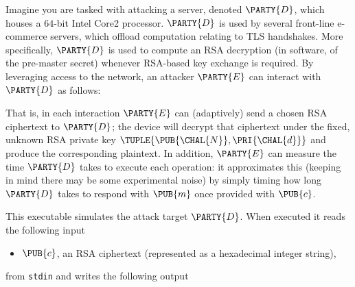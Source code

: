 %



Imagine you are tasked with attacking a server, denoted $\PARTY{D}$, 
which houses a $64$-bit Intel Core2 processor.  
$\PARTY{D}$ is used by several front-line e-commerce servers, which offload
computation relating to TLS handshakes.  More specifically, $\PARTY{D}$ is 
used to compute an RSA decryption (in software, of the pre-master secret)
whenever RSA-based key exchange is required.
By leveraging access to the network, 
an attacker $\PARTY{E}$ can interact with $\PARTY{D}$ as follows:

\begin{center}

\end{center}

\noindent
That is, in each interaction $\PARTY{E}$ can (adaptively) send 
a chosen RSA ciphertext
to $\PARTY{D}$; the device will
decrypt that ciphertext under the fixed, unknown RSA private key $\TUPLE{ \PUB{\CHAL{N}}, \PRI{\CHAL{d}} }$ 
and produce 
the corresponding plaintext.
In addition, $\PARTY{E}$ can measure the time $\PARTY{D}$ takes to execute 
each operation: it approximates this 
(keeping in mind there may be some experimental noise) 
by simply timing how long $\PARTY{D}$ takes to respond with $\PUB{m}$ once
provided with $\PUB{c}$.




This executable simulates the attack target $\PARTY{D}$.  When executed it 
reads the following input

\begin{itemize}
\item $\PUB{c}$,
      an RSA ciphertext
      (represented as a                   hexadecimal integer string),
\end{itemize}

\noindent
from \lstinline[language={bash}]{stdin} and writes the following output

